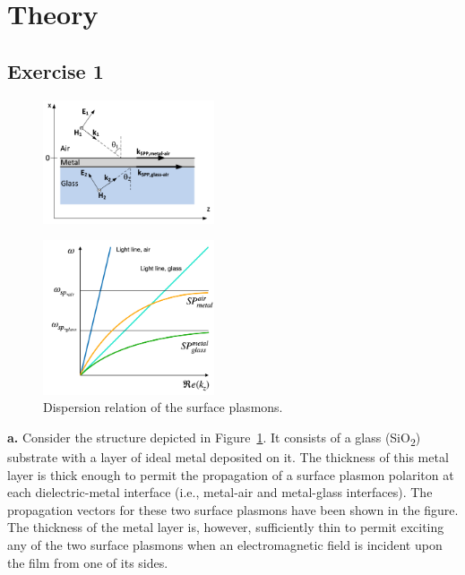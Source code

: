 \documentclass[11pt,a4paper]{article}
\begin{document}
 

\section{Theory}
\subsection*{Exercise 1}


\begin{figure}[ht]
   \centering
    \includegraphics[width=0.45\textwidth]{fig_0.png}
    \caption{}
    \label{fig:fig0}
\end{figure}

\begin{figure}[ht]
   \centering
    \includegraphics[width=0.45\textwidth]{fig_1.png}
    \caption{Dispersion relation of the surface plasmons.}
    \label{fig:fig1}
\end{figure}



\textbf{a. }Consider the structure depicted in Figure~\ref{fig:fig0}. It consists of a glass (SiO\textsubscript{2}) substrate with a layer of ideal metal deposited on it. The thickness of this metal layer is thick enough to permit the propagation of a surface plasmon polariton at each dielectric-metal interface (i.e., metal-air and metal-glass interfaces). The propagation vectors for these two surface plasmons have been shown in the figure. The thickness of the metal layer is, however, sufficiently thin to permit exciting any of the two surface plasmons when an electromagnetic field is incident upon the film from one of its sides.
\end{document}

